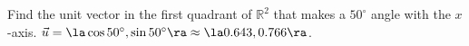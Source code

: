 {Find the unit vector in the first quadrant of $\mathbb{R}^2$ that makes a $50^\circ$ angle with the $x$-axis.
}
{$\vec u = \la \cos 50^\circ,\sin 50^\circ\ra \approx \la 0.643,0.766\ra$.
}
